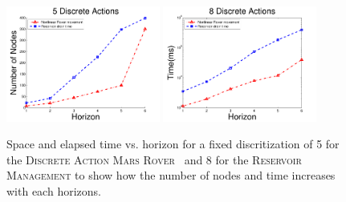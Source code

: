 \documentclass[twoside,11pt]{article}
\newcommand{\MarsRover}{\textsc{Mars Rover }}
\newcommand{\WaterReservoir}{\textsc{Reservoir Management }}
\begin{document}
\begin{figure}[tbp!]
\vspace{2mm}
\centering
\includegraphics[width=0.45\textwidth]{Figures2/camdp/RoverResHorizonNode.pdf}
\includegraphics[width=0.45\textwidth]{Figures2/camdp/RoverResHorizonTime.pdf}
\vspace{-2mm}
\caption{%
Space and elapsed time vs. horizon for a fixed discritization of 5 for the \textsc{Discrete Action} \MarsRover\ and 8 for the \WaterReservoir to show how the number of nodes and time increases with each horizons. 
}
\label{fig:roverDisTS}
\vspace{-5mm}
\end{figure}
\end{document}
